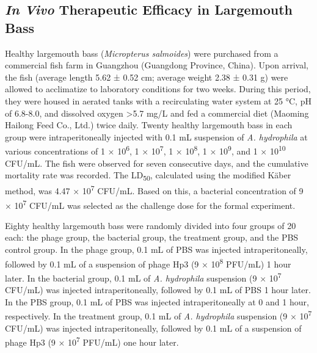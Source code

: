 \documentclass[11pt,a4paper]{article}
\begin{document}
\subsection{\texorpdfstring{\emph{In Vivo} Therapeutic Efficacy in
Largemouth
Bass}{\emph{In Vivo} Therapeutic Efficacy in Largemouth Bass}}\label{in-vivo-therapeutic-efficacy-in-largemouth-bass}

Healthy largemouth bass (\emph{Micropterus salmoides}) were purchased
from a commercial fish farm in Guangzhou (Guangdong Province, China).
Upon arrival, the fish (average length 5.62 ± 0.52 cm; average weight
2.38 ± 0.31 g) were allowed to acclimatize to laboratory conditions for
two weeks. During this period, they were housed in aerated tanks with a
recirculating water system at 25 °C, pH of 6.8-8.0, and dissolved oxygen
\textgreater5.7 mg/L and fed a commercial diet (Maoming Hailong Feed
Co., Ltd.) twice daily. Twenty healthy largemouth bass in each group
were intraperitoneally injected with 0.1 mL suspension of \emph{A.
hydrophila} at various concentrations of 1 × 10\textsuperscript{6}, 1 ×
10\textsuperscript{7}, 1 × 10\textsuperscript{8}, 1 ×
10\textsuperscript{9}, and 1 × 10\textsuperscript{10} CFU/mL. The fish
were observed for seven consecutive days, and the cumulative mortality
rate was recorded. The LD\textsubscript{50}, calculated using the
modified Käber method, was 4.47 × 10\textsuperscript{7} CFU/mL. Based on
this, a bacterial concentration of 9 × 10\textsuperscript{7} CFU/mL was
selected as the challenge dose for the formal experiment.

Eighty healthy largemouth bass were randomly divided into four groups of
20 each: the phage group, the bacterial group, the treatment group, and
the PBS control group. In the phage group, 0.1 mL of PBS was injected
intraperitoneally, followed by 0.1 mL of a suspension of phage Hp3 (9 ×
10\textsuperscript{8} PFU/mL) 1 hour later. In the bacterial group, 0.1
mL of \emph{A. hydrophila} suspension (9 × 10\textsuperscript{7} CFU/mL)
was injected intraperitoneally, followed by 0.1 mL of PBS 1 hour later.
In the PBS group, 0.1 mL of PBS was injected intraperitoneally at 0 and
1 hour, respectively. In the treatment group, 0.1 mL of \emph{A.
hydrophila} suspension (9 × 10\textsuperscript{7} CFU/mL) was injected
intraperitoneally, followed by 0.1 mL of a suspension of phage Hp3 (9 ×
10\textsuperscript{7} PFU/mL) one hour later.
\end{document}
